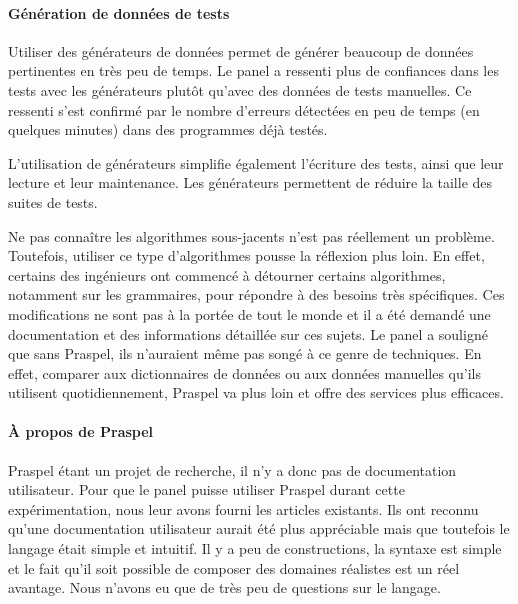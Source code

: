\paragraph{Génération de données de tests} Utiliser des générateurs de données
permet de générer beaucoup de données pertinentes en très peu de temps. Le panel
a ressenti plus de confiances dans les tests avec les générateurs plutôt qu'avec
des données de tests manuelles. Ce ressenti s'est confirmé par le nombre
d'erreurs détectées en peu de temps (en quelques minutes) dans des programmes
déjà testés.

L'utilisation de générateurs simplifie également l'écriture des tests, ainsi que
leur lecture et leur maintenance. Les générateurs permettent de réduire la
taille des suites de tests.

Ne pas connaître les algorithmes sous-jacents n'est pas réellement un problème.
Toutefois, utiliser ce type d'algorithmes pousse la réflexion plus loin. En
effet, certains des ingénieurs ont commencé à détourner certains algorithmes,
notamment sur les grammaires, pour répondre à des besoins très spécifiques. Ces
modifications ne sont pas à la portée de tout le monde et il a été demandé une
documentation et des informations détaillée sur ces sujets. Le panel a souligné
que sans Praspel, ils n'auraient même pas songé à ce genre de techniques. En
effet, comparer aux dictionnaires de données ou aux données manuelles qu'ils
utilisent quotidiennement, Praspel va plus loin et offre des services plus
efficaces.

\paragraph{À propos de Praspel} Praspel étant un projet de recherche, il n'y
a donc pas de documentation utilisateur. Pour que le panel puisse utiliser
Praspel durant cette expérimentation, nous leur avons fourni les articles
existants. Ils ont reconnu qu'une documentation utilisateur aurait été plus
appréciable mais que toutefois le langage était simple et intuitif. Il y a peu
de constructions, la syntaxe est simple et le fait qu'il soit possible de
composer des domaines réalistes est un réel avantage. Nous n'avons eu que de
très peu de questions sur le langage.

